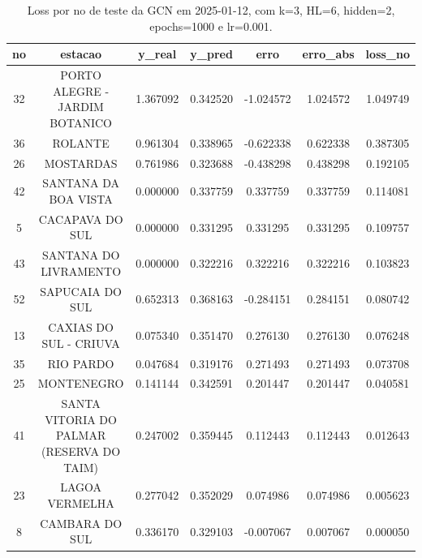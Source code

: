 \begin{table}[h]
\centering
\caption{Loss por no de teste da GCN em 2025-01-12, com k=3, HL=6, hidden=2, epochs=1000 e lr=0.001.}
\label{tab:gcn_loss_k3_hl6_h2_e1000_d20250112}
\begin{tabular}{ccccccc}
\toprule
no & estacao & y\_real & y\_pred & erro & erro\_abs & loss\_no \\
\midrule
32 & PORTO ALEGRE - JARDIM BOTANICO & 1.367092 & 0.342520 & -1.024572 & 1.024572 & 1.049749 \\
36 & ROLANTE & 0.961304 & 0.338965 & -0.622338 & 0.622338 & 0.387305 \\
26 & MOSTARDAS & 0.761986 & 0.323688 & -0.438298 & 0.438298 & 0.192105 \\
42 & SANTANA DA BOA VISTA & 0.000000 & 0.337759 & 0.337759 & 0.337759 & 0.114081 \\
5 & CACAPAVA DO SUL & 0.000000 & 0.331295 & 0.331295 & 0.331295 & 0.109757 \\
43 & SANTANA DO LIVRAMENTO & 0.000000 & 0.322216 & 0.322216 & 0.322216 & 0.103823 \\
52 & SAPUCAIA DO SUL & 0.652313 & 0.368163 & -0.284151 & 0.284151 & 0.080742 \\
13 & CAXIAS DO SUL - CRIUVA & 0.075340 & 0.351470 & 0.276130 & 0.276130 & 0.076248 \\
35 & RIO PARDO & 0.047684 & 0.319176 & 0.271493 & 0.271493 & 0.073708 \\
25 & MONTENEGRO & 0.141144 & 0.342591 & 0.201447 & 0.201447 & 0.040581 \\
41 & SANTA VITORIA DO PALMAR (RESERVA DO TAIM) & 0.247002 & 0.359445 & 0.112443 & 0.112443 & 0.012643 \\
23 & LAGOA VERMELHA & 0.277042 & 0.352029 & 0.074986 & 0.074986 & 0.005623 \\
8 & CAMBARA DO SUL & 0.336170 & 0.329103 & -0.007067 & 0.007067 & 0.000050 \\
\bottomrule
\end{tabular}
\end{table}
